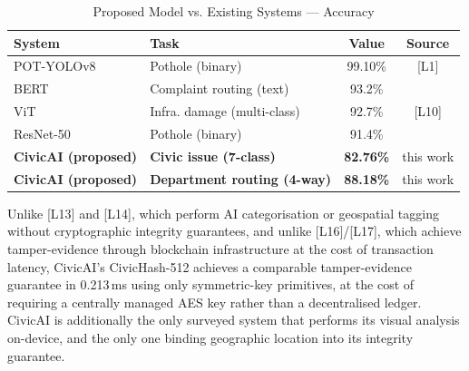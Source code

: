 \documentclass[conference]{IEEEtran}
\begin{document}
\begin{table}[t]
\caption{Proposed Model vs. Existing Systems --- Accuracy}
\label{tab:aiacc}
\centering
\small
\begin{tabular}{llcc}
\toprule
\textbf{System} & \textbf{Task} & \textbf{Value} & \textbf{Source} \\
\midrule
POT-YOLOv8            & Pothole (binary)   & 99.10\% & [L1] \\
BERT                  & Complaint routing (text) & 93.2\% & \cite{almahmoud2023bert} \\
ViT                   & Infra. damage (multi-class) & 92.7\% & [L10] \\
ResNet-50             & Pothole (binary)   & 91.4\% & \cite{zhang2021resnet} \\
\midrule
\textbf{CivicAI (proposed)} & \textbf{Civic issue (7-class)} & \textbf{82.76\%} & this work \\
\textbf{CivicAI (proposed)} & \textbf{Department routing (4-way)} & \textbf{88.18\%} & this work \\
\bottomrule
\end{tabular}
\end{table}

Unlike [L13] and [L14], which perform AI categorisation or geospatial tagging without cryptographic integrity guarantees, and unlike [L16]/[L17], which achieve tamper-evidence through blockchain infrastructure at the cost of transaction latency, CivicAI's CivicHash-512 achieves a comparable tamper-evidence guarantee in 0.213\,ms using only symmetric-key primitives, at the cost of requiring a centrally managed AES key rather than a decentralised ledger. CivicAI is additionally the only surveyed system that performs its visual analysis on-device, and the only one binding geographic location into its integrity guarantee.
\end{document}
